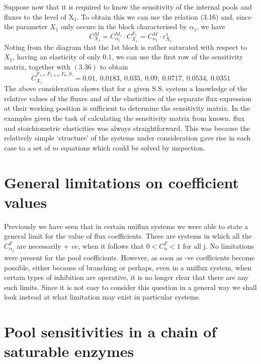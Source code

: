 Suppose now that it is required to know the sensitivity of the internal pools and fluxes to the level of $\mathrm{X}_{1}$. To obtain this we can use the relation (3.16) and, since the parameter $X_{1}$ only occurs in the block characterised by $\alpha_{1}$, we have
%
\begin{equation}
C_{X_{1}}^{M} = C_{\alpha_{1}}^{M_{1}} \cdot C_{X_{1}}^{F_{1}} = C_{\alpha_{1}}^{M} \cdot \varepsilon^{1}_{X_1}
\label{eqn:336}
\end{equation}
%
Noting from the diagram that the 1st block is rather saturated with respect to $X_{1}$, having an elasticity of only $0.1$, we can use the first row of the sensitivity matrix, together with $(3.36)$ to obtain
%
$$
\dot{C}_{X_{1}}^{F_{1,5}, F_{2, 3, 4}, F_{6}, S_{i}} = 0.01,\ 0.0183,\ 0.035,\ 0.09,\ 0.0717,\ 0.0534,\ 0.0351
$$
%
The above consideration shows that for a given S.S. system a knowledge of the relative values of the fluxes and of the elasticities of the separate flux expression at their working position is sufficient to determine the sensitivity matrix. In the examples given the task of calculating the sensitivity matrix from known. flux and stoichiometric elasticities was always straightforward. This was because the relatively simple `structure' of the systems under consideration gave rise in each case to a set of $m$ equations which could be solved by inspection.

\section{General limitations on coefficient values}

Previously we have seen that in certain uniflux systems we were able to state a general limit for the value of flux coefficients. These are systems in which all the $C_{\alpha_{j}}^{F}$ are necessarily + $v e$, when it follows that $0<C_{\alpha}^{F}<1$ for all j. No limitations were present for the pool coefficients. However, as soon as -ve coefficients become possible, either because of branching or perhaps, even in a uniflux system, when certain types of inhibition are operative, it is no longer clear that there are any such limits. Since it is not easy to consider this question in a general way we shall look instead at what limitation may exist in particular systems.

\section{Pool sensitivities in a chain of saturable enzymes}


